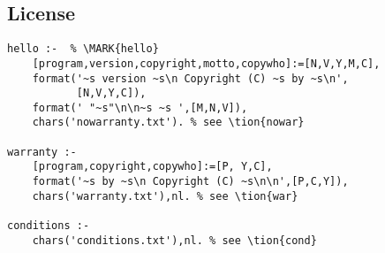 \subsection{ License }\begin{Verbatim}
hello :-  % \MARK{hello}
	[program,version,copyright,motto,copywho]:=[N,V,Y,M,C],
	format('~s version ~s\n Copyright (C) ~s by ~s\n',
	       [N,V,Y,C]),
	format(' "~s"\n\n~s ~s ',[M,N,V]),
	chars('nowarranty.txt'). % see \tion{nowar}
   
warranty :-
	[program,copyright,copywho]:=[P, Y,C],
	format('~s by ~s\n Copyright (C) ~s\n\n',[P,C,Y]),
	chars('warranty.txt'),nl. % see \tion{war}

conditions :-
	chars('conditions.txt'),nl. % see \tion{cond}
\end{Verbatim}
